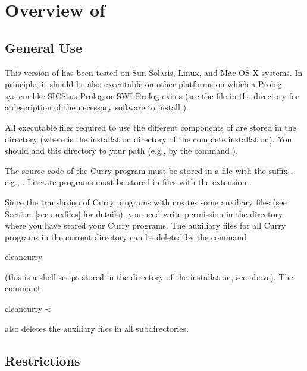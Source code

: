 \section{Overview of \CYS}

\subsection{General Use}
\label{sec-general}

This version of \CYS has been tested on Sun Solaris, Linux, and Mac OS X
systems. In principle, it should be also executable on other
platforms on which a Prolog system like SICStus-Prolog or SWI-Prolog exists
(see the file  in the \CYS directory
for a description of the necessary software to install \CYS).

All executable files required to use the different components
of \CYS are stored in the directory 
(where \cyshome is the installation directory of the complete
\CYS installation). You should add this directory
to your path (e.g., by the  command
).

The source code of the Curry program
must be stored in a file with the suffix ,
e.g., . 
Literate programs must be stored in files with the extension .

Since the translation of Curry programs with \CYS creates
some auxiliary files (see Section~\ref{sec-auxfiles} for details),
you need write permission
in the directory where you have stored your Curry programs.
The auxiliary files for all Curry programs in the current
directory can be deleted by the command
\begin{curry}
cleancurry
\end{curry}
(this is a shell script stored in the  directory of the
\CYS installation, see above).
The command
\begin{curry}
cleancurry -r
\end{curry}
also deletes the auxiliary files in all subdirectories.



\subsection{Restrictions}
\label{sec-restrictions}

